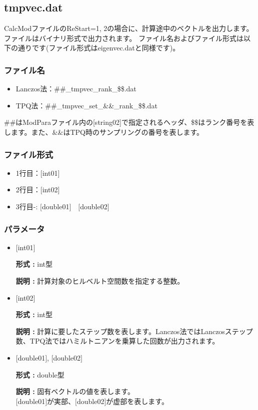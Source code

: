 \newpage
\subsection{{tmpvec.dat}}
\label{Subsec:restart}
CalcModファイルのReStart=1, 2の場合に、計算途中のベクトルを出力します。
ファイルはバイナリ形式で出力されます。
ファイル名およびファイル形式は以下の通りです(ファイル形式はeigenvec.datと同様です)。

\subsubsection{ファイル名}
\begin{itemize}
   \item{Lanczos法：\#\#\_tmpvec\_rank\_\$\$.dat}
   \item{TPQ法：\#\#\_tmpvec\_set\_\&\&\_rank\_\$\$.dat}   
\end{itemize}
  \#\#はModParaファイル内の[string02]で指定されるヘッダ、\$\$はランク番号を表します。また、\&\&はTPQ時のサンプリングの番号を表します。

\subsubsection{ファイル形式}
 \begin{itemize}
   \item  1行目：$[$int01$]$
   \item  2行目：$[$int02$]$
   \item  3行目-: $[$double01$]$~~$[$double02$]$
  \end{itemize}
\subsubsection{パラメータ}
 \begin{itemize}

  \item  $[$int01$]$

 {\bf 形式 :} int型

{\bf 説明 :} 計算対象のヒルベルト空間数を指定する整数。

  \item  $[$int02$]$

 {\bf 形式 :} int型

{\bf 説明 :} { 計算に要したステップ数を表します。Lanczos法ではLanczosステップ数、TPQ法ではハミルトニアンを乗算した回数が出力されます。}
 
 \item  $[$double01$]$, $[$double02$]$

 {\bf 形式 :} double型 

{\bf 説明 :} 固有ベクトルの値を表します。\\
$[$double01$]$が実部、$[$double02$]$が虚部を表します。\\
\end{itemize}

